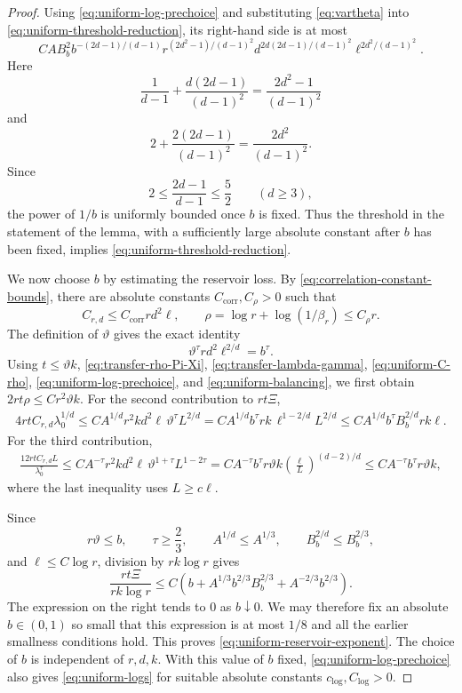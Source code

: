 \documentclass[twoside,12pt]{article}
\theoremstyle{definition}
\theoremstyle{remark}
\newcommand{\1}{\mathbf 1}
\begin{document}
\begin{proof}
Using \eqref{eq:uniform-log-prechoice} and substituting
\eqref{eq:vartheta} into \eqref{eq:uniform-threshold-reduction}, its
right-hand side is at most
\[
 C A B_b^2 b^{-(2d-1)/(d-1)}
 r^{(2d^2-1)/(d-1)^2}
 d^{2d(2d-1)/(d-1)^2}
 \ell^{2d^2/(d-1)^2}.
\]
Here
\[
 \frac1{d-1}+\frac{d(2d-1)}{(d-1)^2}
 =\frac{2d^2-1}{(d-1)^2}
\]
and
\[
 2+\frac{2(2d-1)}{(d-1)^2}
 =\frac{2d^2}{(d-1)^2}.
\]
Since
\[
 2\le\frac{2d-1}{d-1}\le\frac52
 \qquad(d\ge3),
\]
the power of $1/b$ is uniformly bounded once $b$ is fixed. Thus the
threshold in the statement of the lemma, with a sufficiently large absolute
constant after $b$ has been fixed, implies
\eqref{eq:uniform-threshold-reduction}.

We now choose $b$ by estimating the reservoir loss. By
\eqref{eq:correlation-constant-bounds}, there are absolute constants
$C_{\mathrm{corr}},C_{\rho}>0$ such that
\begin{equation}\label{eq:uniform-C-rho}
 C_{r,d}\le C_{\mathrm{corr}}rd^2\ell,
 \qquad
 \rho=\log r+\log(1/\beta_r)\le C_{\rho}r.
\end{equation}
The definition of $\vartheta$ gives the exact identity
\begin{equation}\label{eq:uniform-balancing}
 \vartheta^\tau rd^2\ell^{2/d}=b^\tau.
\end{equation}
Using $t\le\vartheta k$, \eqref{eq:transfer-rho-Pi-Xi},
\eqref{eq:transfer-lambda-gamma}, \eqref{eq:uniform-C-rho},
\eqref{eq:uniform-log-prechoice}, and \eqref{eq:uniform-balancing}, we first
obtain
$
 2rt\rho\le Cr^2\vartheta k.
$
For the second contribution to $rt\Xi$,
\begin{align*}
 4rtC_{r,d}\lambda_0^{1/d}
 \le C A^{1/d}r^2kd^2\ell\,
 \vartheta^\tau L^{2/d}=C A^{1/d}b^\tau rk\,
 \ell^{1-2/d}L^{2/d}\le C A^{1/d}b^\tau B_b^{2/d}rk\ell.
\end{align*}
For the third contribution,
\begin{align*}
 \frac{12rtC_{r,d}L}{\lambda_0^\tau}
 \le C A^{-\tau}r^2kd^2\ell\,
 \vartheta^{1+\tau}L^{1-2\tau}=C A^{-\tau}b^\tau r\vartheta k
 \left(\frac{\ell}{L}\right)^{(d-2)/d}\le C A^{-\tau}b^\tau r\vartheta k,
\end{align*}
where the last inequality uses $L\ge c\ell$.

Since
\[
 r\vartheta\le b,
 \qquad
 \tau\ge\frac23,
 \qquad
 A^{1/d}\le A^{1/3},
 \qquad
 B_b^{2/d}\le B_b^{2/3},
\]
and $\ell\le C\log r$, division by $rk\log r$ gives
\[
 \frac{rt\Xi}{rk\log r}
 \le C\left(
 b+A^{1/3}b^{2/3}B_b^{2/3}
 +A^{-2/3}b^{2/3}
 \right).
\]
The expression on the right tends to $0$ as $b\downarrow0$. We may therefore
fix an absolute $b\in(0,1)$ so small that this expression is at most $1/8$
and all the earlier smallness conditions hold. This proves
\eqref{eq:uniform-reservoir-exponent}. The choice of $b$ is independent of
$r,d,k$. With this value of $b$ fixed,
\eqref{eq:uniform-log-prechoice} also gives \eqref{eq:uniform-logs} for
suitable absolute constants $c_{\log},C_{\log}>0$.


\end{proof}
\end{document}
